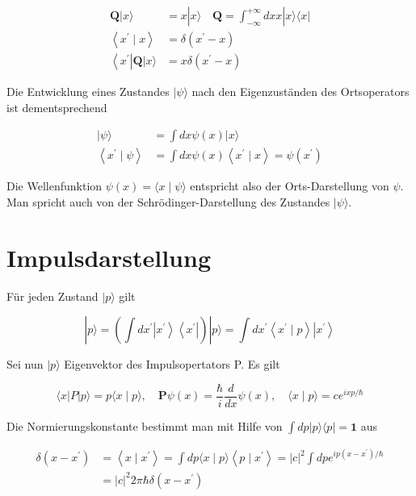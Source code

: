 \documentclass[10pt, letterpaper]{article}
\begin{document}
$$
\begin{aligned}
\mathbf{Q}|x\rangle & =x|x\rangle \quad \mathbf{Q}=\int_{-\infty}^{+\infty} d x x|x\rangle\langle x| \\
\left\langle x^{\prime} \mid x\right\rangle & =\delta\left(x^{\prime}-x\right) \\
\left\langle x^{\prime}\right| \mathbf{Q}|x\rangle & =x \delta\left(x^{\prime}-x\right)
\end{aligned}
$$

Die Entwicklung eines Zustandes $|\psi\rangle$ nach den Eigenzuständen des Ortsoperators ist dementsprechend

$$
\begin{aligned}
|\psi\rangle & =\int d x \psi(x)|x\rangle \\
\left\langle x^{\prime} \mid \psi\right\rangle & =\int d x \psi(x)\left\langle x^{\prime} \mid x\right\rangle=\psi\left(x^{\prime}\right)
\end{aligned}
$$

Die Wellenfunktion $\psi(x)=\langle x \mid \psi\rangle$ entspricht also der Orts-Darstellung von $\psi$. Man spricht auch von der Schrödinger-Darstellung des Zustandes $|\psi\rangle$.

\section*{Impulsdarstellung}
Für jeden Zustand $|p\rangle$ gilt

$$
|p\rangle=\left(\int d x^{\prime}\left|x^{\prime}\right\rangle\left\langle x^{\prime}\right|\right)|p\rangle=\int d x^{\prime}\left\langle x^{\prime} \mid p\right\rangle\left|x^{\prime}\right\rangle
$$

Sei nun $|p\rangle$ Eigenvektor des Impulsopertators P. Es gilt

$$
\langle x| P|p\rangle=p\langle x \mid p\rangle, \quad \mathbf{P} \psi(x)=\frac{\hbar}{i} \frac{d}{d x} \psi(x), \quad\langle x \mid p\rangle=c e^{i x p / \hbar}
$$

Die Normierungskonstante bestimmt man mit Hilfe von $\int d p|p\rangle\langle p|=\mathbf{1}$ aus

$$
\begin{aligned}
\delta\left(x-x^{\prime}\right) & =\left\langle x \mid x^{\prime}\right\rangle=\int d p\langle x \mid p\rangle\left\langle p \mid x^{\prime}\right\rangle=|c|^{2} \int d p e^{i p\left(x-x^{\prime}\right) / \hbar} \\
& =|c|^{2} 2 \pi \hbar \delta\left(x-x^{\prime}\right)
\end{aligned}
$$
\end{document}
